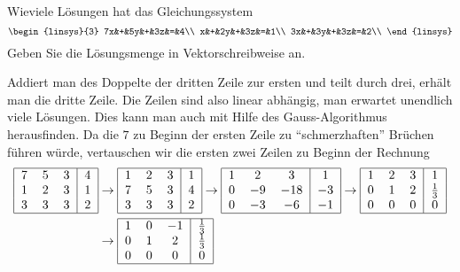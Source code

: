 Wieviele Lösungen hat das Gleichungssystem
\[
\begin{linsys}{3}
7x&+&5y&+&3z&=&4\\
x&+&2y&+&3z&=&1\\
3x&+&3y&+&3z&=&2\\
\end{linsys}
\]
Geben Sie die Lösungsmenge in Vektorschreibweise an.


\begin{loesung}
Addiert man des Doppelte der dritten Zeile zur ersten und teilt
durch drei, erhält man die dritte Zeile. Die Zeilen sind also
linear abhängig, man erwartet
unendlich viele Lösungen. Dies kann man auch mit Hilfe des
Gauss-Algorithmus herausfinden. Da die $7$ zu Beginn der ersten
Zeile zu ``schmerzhaften'' Brüchen führen würde, vertauschen
wir die ersten zwei Zeilen zu Beginn der Rechnung
\begin{align*}
\begin{tabular}{|ccc|c|}
\hline
7&5&3&4\\
1&2&3&1\\
3&3&3&2\\
\hline
\end{tabular}
&\rightarrow
\begin{tabular}{|ccc|c|}
\hline
1&2&3&1\\
7&5&3&4\\
3&3&3&2\\
\hline
\end{tabular}
\rightarrow
\begin{tabular}{|ccc|c|}
\hline
1&2&3&1\\
0&$-9$&$-18$&$-3$\\
0&$-3$&$-6$&$-1$\\
\hline
\end{tabular}
\rightarrow
\begin{tabular}{|ccc|c|}
\hline
1&2&3&1\\
0&1&2&$\frac13$\\
0&0&0&0\\
\hline
\end{tabular}
\\
&\rightarrow
\begin{tabular}{|ccc|c|}
\hline
1&0&$-1$&$\frac13$\\
0&1&2&$\frac13$\\
0&0&0&0\\
\hline
\end{tabular}
\end{align*}

\end{loesung}
